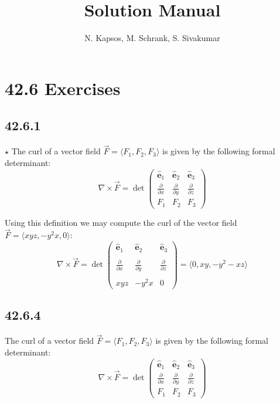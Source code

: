 \documentclass{article}
\title{Solution Manual}
\author{N. Kapsos, M. Schrank, S. Sivakumar}
\date{}
\begin{document}
\maketitle
\setcounter{secnumdepth}{0}

\section{42.6 Exercises}

\subsection{42.6.1}

$\star$ The curl of a vector field $\vec{F} = \langle F_1, F_2 ,F_3 \rangle$ is given by the following formal determinant:
$$\nabla \times \vec{F} = \det \begin{pmatrix}
    \hat{\mathbf{e}}_1 & \hat{\mathbf{e}}_2 & \hat{\mathbf{e}}_3 \\
    \frac{\partial}{\partial x} & \frac{\partial}{\partial y} & \frac{\partial}{\partial z} \\
    F_1 & F_2 & F_3
\end{pmatrix}$$

Using this definition we may compute the curl of the vector field $\vec{F} = \langle xyz, -y^2x,0 \rangle$:
$$\nabla \times \vec{F} = \det \begin{pmatrix}
    \hat{\mathbf{e}}_1 & \hat{\mathbf{e}}_2 & \hat{\mathbf{e}}_3 \\
    \\
    \frac{\partial}{\partial x} & \frac{\partial}{\partial y} & \frac{\partial}{\partial z} \\
    \\
    xyz & -y^2x & 0
\end{pmatrix} = \langle 0, xy , -y^2-xz \rangle$$

\subsection{42.6.4}

The curl of a vector field $\vec{F} = \langle F_1, F_2 ,F_3 \rangle$ is given by the following formal determinant:
$$\nabla \times \vec{F} = \det \begin{pmatrix}
    \hat{\mathbf{e}}_1 & \hat{\mathbf{e}}_2 & \hat{\mathbf{e}}_3 \\
    \frac{\partial}{\partial x} & \frac{\partial}{\partial y} & \frac{\partial}{\partial z} \\
    F_1 & F_2 & F_3
\end{pmatrix}$$
\end{document}
